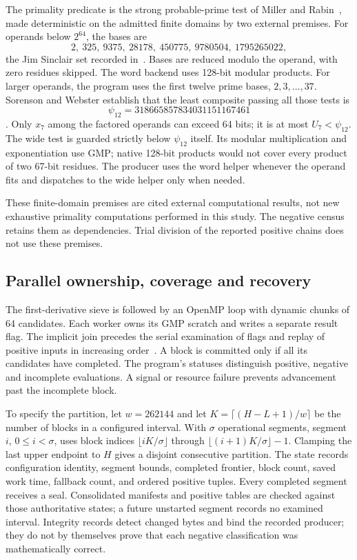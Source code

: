 \documentclass[11pt]{article}
\theoremstyle{definition}
\theoremstyle{remark}
\begin{document}
The primality predicate is the strong probable-prime test
of Miller and Rabin~\cite{miller,rabin}, made deterministic on the
admitted finite domains
by two external premises. For operands below $2^{64}$, the bases are
\[
 2,\ 325,\ 9375,\ 28178,\ 450775,\ 9780504,\ 1795265022,
\]
the Jim Sinclair set recorded in~\cite{bases}. Bases are reduced
modulo the operand, with zero residues skipped. The word backend
uses 128-bit modular products. For larger operands, the program
uses the first twelve prime bases, $2,3,\ldots,37$.
Sorenson and Webster establish that the least composite passing
all those tests is
\begin{equation}\label{eq:psi12}
 \psi_{12}=318665857834031151167461
\end{equation}
\cite[Theorem 1.1 of the preprint]{sorenson}.
Only $x_7$ among the factored operands can exceed 64 bits; it is at
most $U_7<\psi_{12}$. The wide test is guarded strictly below
$\psi_{12}$ itself. Its modular multiplication and exponentiation use
GMP; native 128-bit products would not cover every product of
two 67-bit residues. The producer uses the word helper whenever
the operand fits and dispatches to the wide helper only when needed.

These finite-domain premises are cited external computational results,
not new exhaustive primality computations performed in this study.
The negative census retains them as dependencies. Trial division of
the reported positive chains does not use these premises.

\subsection{Parallel ownership, coverage and recovery}

The first-derivative sieve is followed by an OpenMP loop with
dynamic chunks of 64 candidates. Each worker owns its GMP scratch
and writes a separate result flag. The implicit join precedes the
serial examination of flags and replay of positive inputs in
increasing order~\cite{openmp}. A block is committed only if all
its candidates have completed. The program's statuses distinguish
positive, negative and incomplete evaluations. A signal or resource
failure prevents advancement past the incomplete block.

To specify the partition, let $w=262144$ and let
$K=\lceil(H-L+1)/w\rceil$ be the number of blocks in a configured
interval. With $\sigma$ operational segments, segment $i$, $0\le i<\sigma$,
uses block indices
$\lfloor iK/\sigma\rfloor$ through
$\lfloor(i+1)K/\sigma\rfloor-1$.
Clamping the last upper endpoint to $H$ gives a disjoint consecutive
partition. The state records configuration identity, segment bounds,
completed frontier, block count, saved work time, fallback count,
and ordered positive tuples. Every completed segment receives a
seal. Consolidated manifests and positive tables are checked against
those authoritative states; a future unstarted segment records no
examined interval. Integrity records detect changed bytes and bind
the recorded producer; they do not by themselves prove that each
negative classification was mathematically correct.
\end{document}
